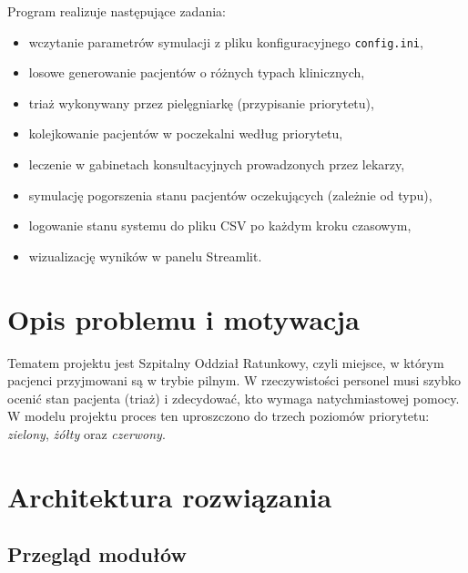 \documentclass[12pt,a4paper]{article}
\begin{document}
Program realizuje następujące zadania:
\begin{itemize}[noitemsep]
	\item wczytanie parametrów symulacji z pliku konfiguracyjnego \texttt{config.ini},
	\item losowe generowanie pacjentów o różnych typach klinicznych,
	\item triaż wykonywany przez pielęgniarkę (przypisanie priorytetu),
	\item kolejkowanie pacjentów w poczekalni według priorytetu,
	\item leczenie w gabinetach konsultacyjnych prowadzonych przez lekarzy,
	\item symulację pogorszenia stanu pacjentów oczekujących (zależnie od typu),
	\item logowanie stanu systemu do pliku CSV po każdym kroku czasowym,
	\item wizualizację wyników w panelu Streamlit.
\end{itemize}

\section{Opis problemu i motywacja}

Tematem projektu jest Szpitalny Oddział Ratunkowy, czyli miejsce, w którym
pacjenci przyjmowani są w trybie pilnym. W rzeczywistości personel musi szybko
ocenić stan pacjenta (triaż) i zdecydować, kto wymaga natychmiastowej pomocy.
W modelu projektu proces ten uproszczono do trzech poziomów priorytetu:
\emph{zielony}, \emph{żółty} oraz \emph{czerwony}.

\section{Architektura rozwiązania}

\subsection{Przegląd modułów}
\end{document}
